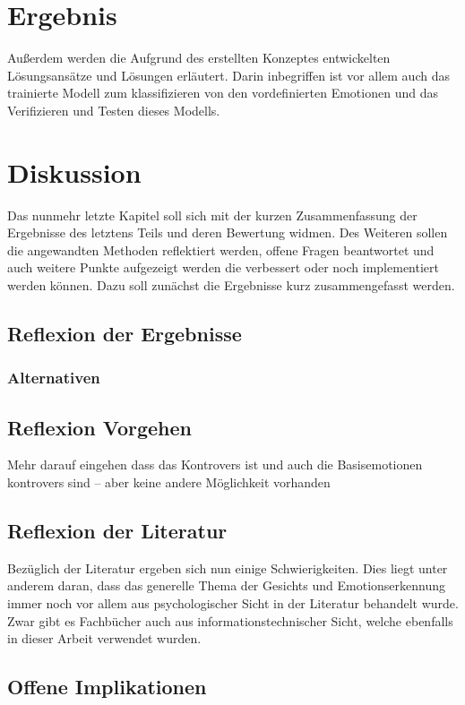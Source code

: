 \documentclass[12pt, a4paper]{scrbook}
\begin{document}
\chapter{Ergebnis}
Außerdem werden die Aufgrund des erstellten Konzeptes entwickelten Lösungsansätze und Lösungen erläutert. Darin inbegriffen ist vor allem auch das trainierte Modell zum klassifizieren von den vordefinierten Emotionen und das Verifizieren und Testen dieses Modells.

\let\cleardoublepage\relax
\chapter{Diskussion}
Das nunmehr letzte Kapitel soll sich mit der kurzen Zusammenfassung der Ergebnisse des letztens Teils und deren Bewertung widmen. 
Des Weiteren sollen die angewandten Methoden reflektiert werden,
offene Fragen beantwortet und auch weitere Punkte aufgezeigt werden die verbessert oder noch implementiert werden können. Dazu soll zunächst die Ergebnisse kurz zusammengefasst werden.

\section{Reflexion der Ergebnisse}

\subsection{Alternativen}

\section{Reflexion Vorgehen}
Mehr darauf eingehen dass das Kontrovers ist und auch die Basisemotionen kontrovers sind --  aber keine andere Möglichkeit vorhanden 

\section{Reflexion der Literatur}
Bezüglich der Literatur ergeben sich nun einige Schwierigkeiten. Dies liegt unter anderem daran, dass das generelle Thema der Gesichts und Emotionserkennung immer noch vor allem aus
psychologischer Sicht in der Literatur behandelt wurde. Zwar gibt es Fachbücher auch aus informationstechnischer Sicht, welche ebenfalls in dieser Arbeit verwendet wurden.

\section{Offene Implikationen}
\end{document}
